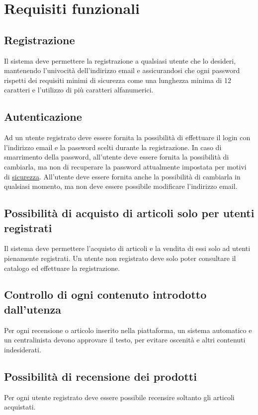 \documentclass[12pt,a4paper]{article}
\begin{document}
\newpage
\section{Requisiti funzionali}
\subsection{Registrazione}
Il sistema deve permettere la registrazione a qualsiasi utente che lo desideri, mantenendo l'univocità dell'indirizzo email e assicurandosi che ogni password rispetti dei requisiti minimi di sicurezza come una lunghezza minima di 12 caratteri e l'utilizzo di più caratteri alfanumerici.

\subsection{Autenticazione}
Ad un utente registrato deve essere fornita la possibilità di effettuare il login con l'indirizzo email e la password scelti durante la registrazione. In caso di smarrimento della password, all'utente deve essere fornita la possibilità di cambiarla, ma non di recuperare la password attualmente impostata per motivi di  \hyperref[sec:security]{sicurezza}. All'utente deve essere fornita anche la possibilità di cambiarla in qualsiasi momento, ma non deve essere possibile modificare l'indirizzo email.

\subsection{Possibilità di acquisto di articoli solo per utenti registrati}
Il sistema deve permettere l'acquisto di articoli e la vendita di essi solo ad utenti pienamente registrati. Un utente non registrato deve solo poter consultare il catalogo ed effettuare la registrazione.

\subsection{Controllo di ogni contenuto introdotto dall'utenza}
Per ogni recensione o articolo inserito nella piattaforma, un sistema automatico e un centralinista devono approvare il testo, per evitare oscenità e altri contenuti indesiderati.

\subsection{Possibilità di recensione dei prodotti}
Per ogni utente registrato deve essere possibile recensire soltanto gli articoli acquistati.
\end{document}
